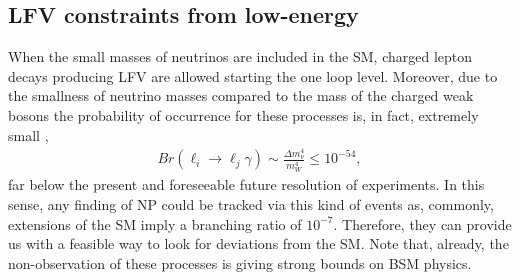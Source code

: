 \documentclass[aps,prd,groupaddress,floatfix,tighten,nofootinbib,showpacs,
amsfonts,superscriptaddress]{revtex4}
\begin{document}
{%
%

\subsection{LFV constraints from low-energy\label{subsec:LFVconst}}
When the small masses of neutrinos are included in the SM, charged lepton decays producing LFV are allowed starting the one loop level. Moreover, due to the smallness of neutrino masses compared to the mass of the charged weak bosons the probability of occurrence for these processes is, in fact, extremely small \cite{Deppisch:2012vj},
\begin{eqnarray}
	{B}r (\ell_i \rightarrow \ell_j \gamma) \sim \frac{\Delta m_\nu^4}{m_W^4}  \leq 10^{-54},
\end{eqnarray}
far below the present and foreseeable future resolution of experiments. In this sense, any finding of NP could be tracked via this kind of events as, commonly, extensions of the SM imply a branching ratio of $10^{-7}$. Therefore, they can provide us with a feasible way to look for deviations from the SM. Note that, already, the non-observation of these processes is giving strong bounds on BSM physics.

}
\end{document}
